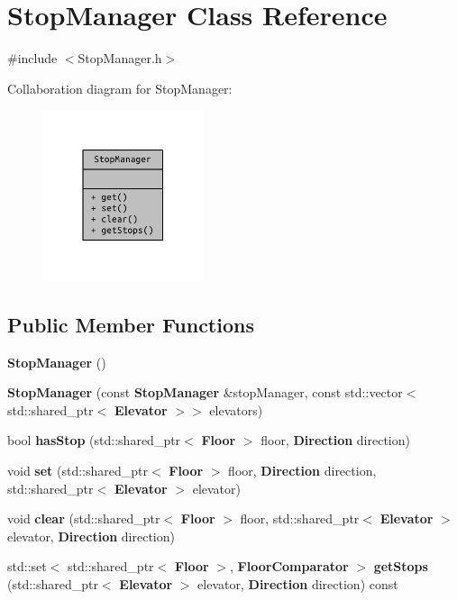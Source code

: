 \section{Stop\+Manager Class Reference}
\label{class_stop_manager}


{\ttfamily \#include $<$Stop\+Manager.\+h$>$}



Collaboration diagram for Stop\+Manager\+:
\nopagebreak
\begin{figure}[H]
\begin{center}
\leavevmode
\includegraphics[width=133pt]{class_stop_manager__coll__graph}
\end{center}
\end{figure}
\subsection*{Public Member Functions}
\begin{DoxyCompactItemize}
\item 
{\bf Stop\+Manager} ()
\item 
{\bf Stop\+Manager} (const {\bf Stop\+Manager} \&stop\+Manager, const std\+::vector$<$ std\+::shared\+\_\+ptr$<$ {\bf Elevator} $>$$>$ elevators)
\item 
bool {\bf has\+Stop} (std\+::shared\+\_\+ptr$<$ {\bf Floor} $>$ floor, {\bf Direction} direction)
\item 
void {\bf set} (std\+::shared\+\_\+ptr$<$ {\bf Floor} $>$ floor, {\bf Direction} direction, std\+::shared\+\_\+ptr$<$ {\bf Elevator} $>$ elevator)
\item 
void {\bf clear} (std\+::shared\+\_\+ptr$<$ {\bf Floor} $>$ floor, std\+::shared\+\_\+ptr$<$ {\bf Elevator} $>$ elevator, {\bf Direction} direction)
\item 
std\+::set$<$ std\+::shared\+\_\+ptr$<$ {\bf Floor} $>$, {\bf Floor\+Comparator} $>$ {\bf get\+Stops} (std\+::shared\+\_\+ptr$<$ {\bf Elevator} $>$ elevator, {\bf Direction} direction) const 
\end{DoxyCompactItemize}


